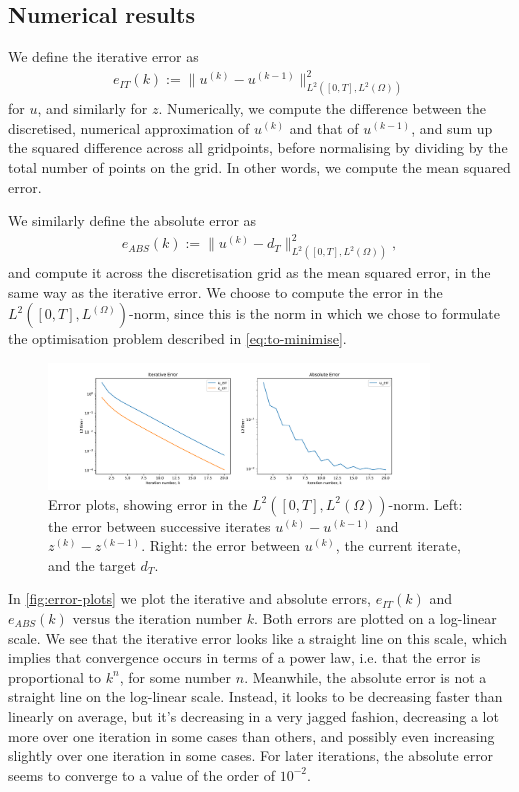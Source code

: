 \subsection{Numerical results}

We define the iterative error as
%
\begin{align} 
    e_{IT}(k) := \lVert u^{(k)}-u^{(k-1)} \rVert^2_{L^2([0,T],L^2(\Omega))}
\end{align}
%
for $u$, and similarly for $z$. Numerically, we compute the difference between the discretised, numerical approximation of $u^{(k)}$ and that of $u^{(k-1)}$, and sum up the squared difference across all gridpoints, before normalising by dividing by the total number of points on the grid. In other words, we compute the mean squared error.

We similarly define the absolute error as 
%
\begin{align} 
    e_{ABS}(k) := \lVert u^{(k)}-d_T \rVert^2_{L^2([0,T],L^2(\Omega))},
\end{align}
%
and compute it across the discretisation grid as the mean squared error, in the same way as the iterative error. We choose to compute the error in the $L^2([0,T],L^(\Omega))$-norm, since this is the norm in which we chose to formulate the optimisation problem described in \autoref{eq:to-minimise}. 

\begin{figure}[h]
    \centering
    \includegraphics[width=0.9\textwidth]{error_plots.pdf}
    \caption{Error plots, showing error in the $L^2([0,T],L^2(\Omega))$-norm. Left: the error between successive iterates $u^{(k)}-u^{(k-1)}$ and $z^{(k)}-z^{(k-1)}$. Right: the error between $u^{(k)}$, the current iterate, and the target $d_T$.}\label{fig:error-plots}
\end{figure}

In \autoref{fig:error-plots} we plot the iterative and absolute errors, $e_{IT}(k)$ and $e_{ABS}(k)$ versus the iteration number $k$. Both errors are plotted on a log-linear scale. We see that the iterative error looks like a straight line on this scale, which implies that convergence occurs in terms of a power law, i.e. that the error is proportional to $k^{n}$, for some number $n$. Meanwhile, the absolute error is not a straight line on the log-linear scale. Instead, it looks to be decreasing faster than linearly on average, but it's decreasing in a very jagged fashion, decreasing a lot more over one iteration in some cases than others, and possibly even increasing slightly over one iteration in some cases. For later iterations, the absolute error seems to converge to a value of the order of $10^{-2}$. 

